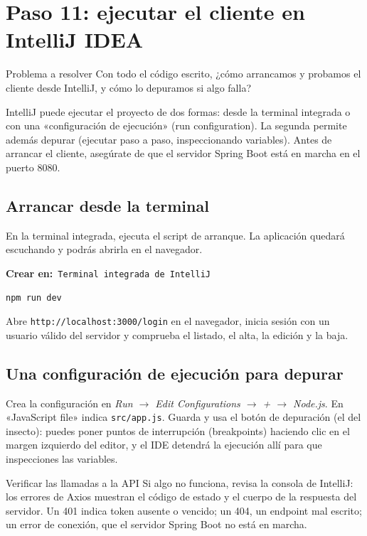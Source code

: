 \documentclass[11pt]{article}
\newcommand{\crearen}[1]{{\small\color{ndverdeo}\textbf{Crear en:}~}\texttt{#1}\par\nobreak\vspace{-1pt}}
\begin{document}
\section{Paso 11: ejecutar el cliente en IntelliJ IDEA}
\begin{cajaproblema}{Problema a resolver}
Con todo el código escrito, ¿cómo arrancamos y probamos el cliente desde IntelliJ, y cómo lo depuramos si algo falla?\par
\end{cajaproblema}
IntelliJ puede ejecutar el proyecto de dos formas: desde la terminal integrada o con una «configuración de ejecución» (run configuration). La segunda permite además depurar (ejecutar paso a paso, inspeccionando variables). Antes de arrancar el cliente, asegúrate de que el servidor Spring Boot está en marcha en el puerto 8080.

\subsection{Arrancar desde la terminal}
En la terminal integrada, ejecuta el script de arranque. La aplicación quedará escuchando y podrás abrirla en el navegador.

\crearen{Terminal integrada de IntelliJ}
\begin{cajacodigo}
\begin{lstlisting}[style=bash]
npm run dev
\end{lstlisting}
\end{cajacodigo}
\vspace{2pt}
Abre \texttt{http://\allowbreak{}localhost:\allowbreak{}3000/\allowbreak{}login} en el navegador, inicia sesión con un usuario válido del servidor y comprueba el listado, el alta, la edición y la baja.

\subsection{Una configuración de ejecución para depurar}
Crea la configuración en \emph{Run $\rightarrow$ Edit Configurations $\rightarrow$ + $\rightarrow$ Node.js}. En «JavaScript file» indica \texttt{src/\allowbreak{}app.js}. Guarda y usa el botón de depuración (el del insecto): puedes poner puntos de interrupción (breakpoints) haciendo clic en el margen izquierdo del editor, y el IDE detendrá la ejecución allí para que inspecciones las variables.

\begin{cajatip}{Verificar las llamadas a la API}
Si algo no funciona, revisa la consola de IntelliJ: los errores de Axios muestran el código de estado y el cuerpo de la respuesta del servidor. Un 401 indica token ausente o vencido; un 404, un endpoint mal escrito; un error de conexión, que el servidor Spring Boot no está en marcha.\par
\end{cajatip}
\end{document}
